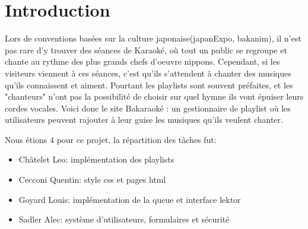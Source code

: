 \section{Introduction}
    Lors de conventions basées sur la culture japonaise(japanExpo, bakanim), il n'est pas rare d'y trouver des séances de Karaoké, où tout un public se regroupe et chante au rythme des plus grands chefs d'oeuvre nippons. \newline
Cependant, si les visiteurs viennent à ces séances, c'est qu'ils s'attendent à chanter des musiques qu'ils connaissent et aiment. Pourtant les playlists sont souvent préfaites, et les "chanteurs" n'ont pas la possibilité de choisir sur quel hymne ils vont épuiser leurs cordes vocales. \newline
Voici donc le site Bakaraoké : un gestionnaire de playlist où les utilisateurs peuvent rajouter à leur guise les musiques qu'ils veulent chanter. \newline

Nous étions 4 pour ce projet, la répartition des tâches fut:
\begin{itemize}
    \item Châtelet Leo: implémentation des playlists
    \item Cecconi Quentin: style css et pages html
    \item Goyard Louis: implémentation de la queue et interface lektor
    \item Sadler Alec: système d'utilisateurs, formulaires et sécurité
\end{itemize}
